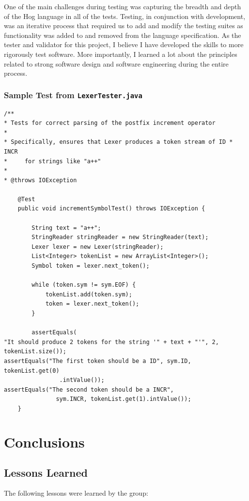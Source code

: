\documentclass{report}
\begin{document}
One of the main challenges during testing was capturing the breadth and depth of the Hog language in all of the tests. Testing, in conjunction with development, was an iterative process that required us to add and modify the testing suites as functionality was added to and removed from the language specification. As the tester and validator for this project, I believe I have developed the skills to more rigorously test software. More importantly, I learned a lot about the principles related to strong software design and software engineering during the entire process. 

\subsection*{Sample Test from \tt LexerTester.java\rm}

\begin{verbatim}
/**
* Tests for correct parsing of the postfix increment operator
* 
* Specifically, ensures that Lexer produces a token stream of ID * INCR 
*     for strings like "a++"
* 
* @throws IOException

	@Test
	public void incrementSymbolTest() throws IOException {

		String text = "a++";
		StringReader stringReader = new StringReader(text);
		Lexer lexer = new Lexer(stringReader);
		List<Integer> tokenList = new ArrayList<Integer>();
		Symbol token = lexer.next_token();

		while (token.sym != sym.EOF) {
			tokenList.add(token.sym);
			token = lexer.next_token();
		}

		assertEquals(
"It should produce 2 tokens for the string '" + text + "'", 2, tokenList.size());
assertEquals("The first token should be a ID", sym.ID, tokenList.get(0)
				.intValue());
assertEquals("The second token should be a INCR", 
               sym.INCR, tokenList.get(1).intValue());
	}
\end{verbatim}

\chapter{Conclusions}
\label{chap:concl}

\section{Lessons Learned}
\label{sec:lessons}

The following lessons were learned by the group:
\end{document}
